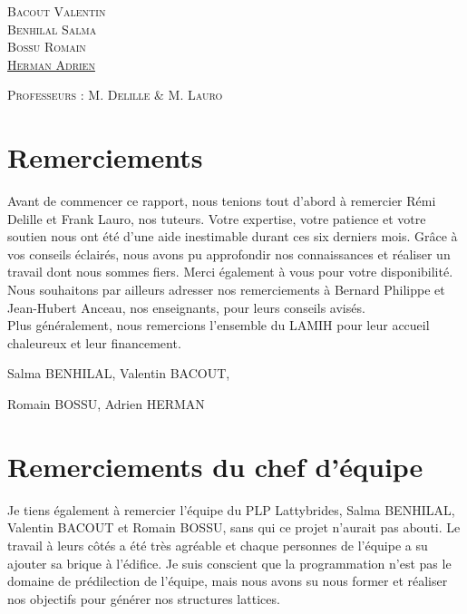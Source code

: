\documentclass[a4paper]{article}
\begin{document}
\begin{titlepage}
\begin{center}
			\begin{minipage}{1\textwidth}\large
				\textsc{Bacout Valentin}\\
				\textsc{Benhilal Salma}\\
				\textsc{Bossu Romain}\\
				\textsc{\underline{Herman Adrien}}
				\begin{flushright}
				\textsc{{Professeurs : M. Delille \& M. Lauro}}
				\end{flushright}
			\end{minipage}
		\end{center}
	\end{titlepage}
	
	\section*{Remerciements}
	
	\hspace{0.5cm}Avant de commencer ce rapport, nous tenions tout d’abord à remercier Rémi Delille et Frank Lauro, nos tuteurs. Votre expertise, votre patience et votre soutien nous ont été d'une aide inestimable durant ces six derniers mois. Grâce à vos conseils éclairés, nous avons pu approfondir nos connaissances et réaliser un travail dont nous sommes fiers. Merci également à vous pour votre disponibilité.\\
	
	Nous souhaitons par ailleurs adresser nos remerciements à Bernard Philippe et Jean-Hubert Anceau, nos enseignants, pour leurs conseils avisés.\\
	
	Plus généralement, nous remercions l’ensemble du LAMIH pour leur accueil chaleureux et leur financement.\\
	
	\begin{flushright}
		Salma BENHILAL, Valentin BACOUT,
		
		Romain BOSSU, Adrien HERMAN
	\end{flushright}
	
	\section*{Remerciements du chef d'équipe}
	
	\hspace{0.5cm}Je tiens également à remercier l'équipe du PLP Lattybrides, Salma BENHILAL, Valentin BACOUT et Romain BOSSU, sans qui ce projet n'aurait pas abouti. Le travail à leurs côtés a été très agréable et chaque personnes de l'équipe a su ajouter sa brique à l'édifice. Je suis conscient que la programmation n'est pas le domaine de prédilection de l'équipe, mais nous avons su nous former et réaliser nos objectifs pour générer nos structures lattices.\\
	
\end{document}
